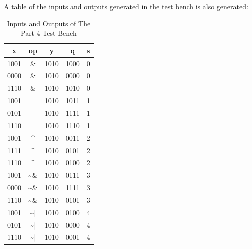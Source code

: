 \documentclass[paper=usletter, fontsize=12pt]{article}
\begin{document}
    A table of the inputs and outputs generated in the test bench is also generated:

    \begin{table}[h]

        \caption{Inputs and Outputs of The Part 4 Test Bench}
        \centering
        \begin{tabular*}{200pt}{@{\extracolsep{\fill}} ccccc}

            \textbf{x} & \textbf{op} & \textbf{y} & \textbf{q} & \textbf{s} \\
            \hline
            1001 & {\&} & 1010 & 1000 & 0 \\
            0000 & {\&} & 1010 & 0000 & 0 \\
            1110 & {\&} & 1010 & 1010 & 0 \\
            1001 & {|} & 1010 & 1011 & 1 \\
            0101 & {|} & 1010 & 1111 & 1 \\
            1110 & {|} & 1010 & 1110 & 1 \\
            1001 & \textasciicircum & 1010 & 0011 & 2 \\
            1111 & \textasciicircum & 1010 & 0101 & 2 \\
            1110 & \textasciicircum & 1010 & 0100 & 2 \\
            1001 & {\textasciitilde \&} & 1010 & 0111 & 3 \\
            0000 & {\textasciitilde \&} & 1010 & 1111 & 3 \\
            1110 & {\textasciitilde \&} & 1010 & 0101 & 3 \\
            1001 & {\textasciitilde | } & 1010 & 0100 & 4 \\
            0101 & {\textasciitilde | } & 1010 & 0000 & 4 \\
            1110 & {\textasciitilde | } & 1010 & 0001 & 4 \\
        \end{tabular*}
    \end{table}
\end{document}
